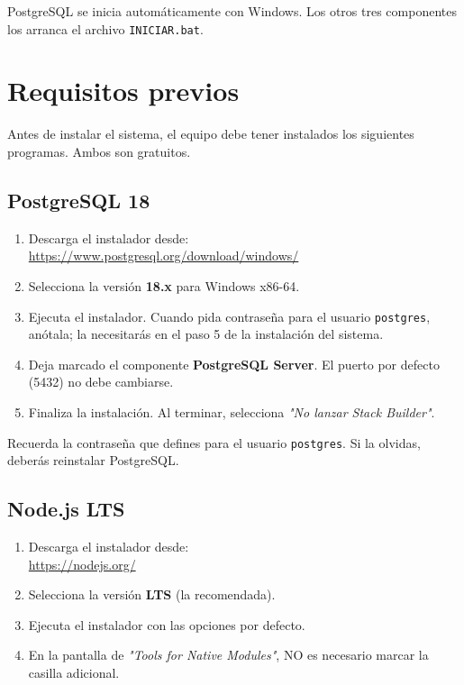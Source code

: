 \documentclass[12pt, a4paper]{article}
\begin{document}
PostgreSQL se inicia automáticamente con Windows. Los otros tres
componentes los arranca el archivo \texttt{INICIAR.bat}.

\section{Requisitos previos}

Antes de instalar el sistema, el equipo debe tener instalados
los siguientes programas. Ambos son gratuitos.

\subsection{PostgreSQL 18}

\begin{enumerate}
  \item Descarga el instalador desde:\\
        \url{https://www.postgresql.org/download/windows/}
  \item Selecciona la versión \textbf{18.x} para Windows x86-64.
  \item Ejecuta el instalador. Cuando pida contraseña para el usuario
        \texttt{postgres}, anótala; la necesitarás en el paso 5 de la
        instalación del sistema.
  \item Deja marcado el componente \textbf{PostgreSQL Server}.
        El puerto por defecto (5432) no debe cambiarse.
  \item Finaliza la instalación. Al terminar, selecciona
        \emph{"No lanzar Stack Builder"}.
\end{enumerate}

\begin{importante}
  Recuerda la contraseña que defines para el usuario \texttt{postgres}.
  Si la olvidas, deberás reinstalar PostgreSQL.
\end{importante}

\subsection{Node.js LTS}

\begin{enumerate}
  \item Descarga el instalador desde:\\
        \url{https://nodejs.org/}
  \item Selecciona la versión \textbf{LTS} (la recomendada).
  \item Ejecuta el instalador con las opciones por defecto.
  \item En la pantalla de \emph{"Tools for Native Modules"}, NO es
        necesario marcar la casilla adicional.
\end{enumerate}
\end{document}

